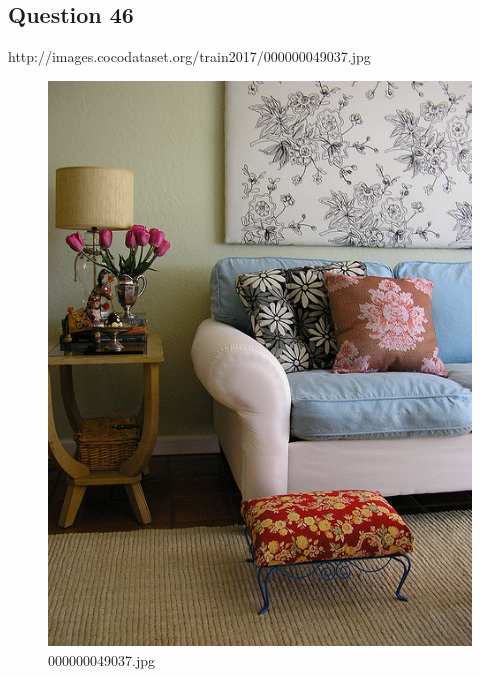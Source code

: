 \subsection*{Question 46}
http://images.cocodataset.org/train2017/000000049037.jpg
\begin{figure}[h]
    \centering
    \includegraphics[width=0.8\linewidth]{../image set/hard/000000049037.jpg}
    \caption{000000049037.jpg}
\end{figure}
